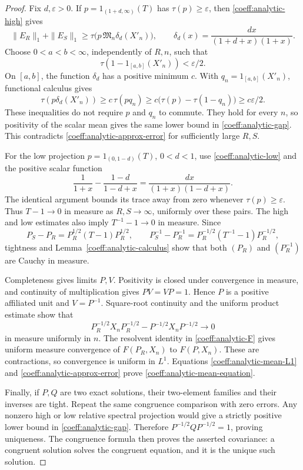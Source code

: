 \begin{proof}
Fix \(d,\varepsilon>0\).  If \(p=1_{(1+d,\infty)}(T)\) has
\(\tau(p)\ge\varepsilon\), then
\eqref{coeff:analytic-high} gives
\begin{equation}\label{coeff:analytic-gap}
 \|E_R\|_1+\|E_S\|_1
 \ge \tau\bigl(p\,\mathfrak M_n\delta_d(X'_n)\bigr),\qquad
 \delta_d(x)=\frac{dx}{(1+d+x)(1+x)}.
\end{equation}
Choose \(0<a<b<\infty\), independently of \(R,n\), such that
\[
 \tau(1-1_{[a,b]}(X'_n))<\varepsilon/2.
\]
On \([a,b]\), the function \(\delta_d\) has a positive minimum \(c\).
With \(q_n=1_{[a,b]}(X'_n)\), functional calculus gives
\[
 \tau(p\delta_d(X'_n))
 \ge c\,\tau(pq_n)
 \ge c\bigl(\tau(p)-\tau(1-q_n)\bigr)
 \ge c\varepsilon/2.
\]
These inequalities do not require \(p\) and \(q_n\) to commute.
They hold for every \(n\), so positivity of the scalar mean gives
the same lower bound in \eqref{coeff:analytic-gap}.  This contradicts
\eqref{coeff:analytic-approx-error} for sufficiently large \(R,S\).

For the low projection \(p=1_{(0,1-d)}(T)\), \(0<d<1\), use
\eqref{coeff:analytic-low} and the positive scalar function
\[
 \frac{1}{1+x}-\frac{1-d}{1-d+x}
       =\frac{dx}{(1+x)(1-d+x)}.
\]
The identical argument bounds its trace away from zero whenever
\(\tau(p)\ge\varepsilon\).  Thus \(T-1\to0\) in measure as \(R,S\to\infty\),
uniformly over these pairs.  The high and low estimates also imply
\(T^{-1}-1\to0\) in measure.  Since
\[
 P_S-P_R=P_R^{1/2}(T-1)P_R^{1/2},\qquad
 P_S^{-1}-P_R^{-1}
       =P_R^{-1/2}(T^{-1}-1)P_R^{-1/2},
\]
tightness and Lemma~\ref{coeff:analytic-calculus} show that both
\((P_R)\) and \((P_R^{-1})\) are Cauchy in measure.

Completeness gives limits \(P,V\).  Positivity is closed under
convergence in measure, and continuity of multiplication gives
\(PV=VP=1\).  Hence \(P\) is a positive affiliated unit and \(V=P^{-1}\).
Square-root continuity and the uniform product estimate show that
\[
 P_R^{-1/2}X_nP_R^{-1/2}
       -P^{-1/2}X_nP^{-1/2}\longrightarrow0
\]
in measure uniformly in \(n\).  The resolvent identity in
\eqref{coeff:analytic-F} gives uniform measure convergence of
\(F(P_R,X_n)\) to \(F(P,X_n)\).  These are contractions, so convergence
is uniform in \(L^1\).  Equations
\eqref{coeff:analytic-mean-L1} and
\eqref{coeff:analytic-approx-error} prove
\eqref{coeff:analytic-mean-equation}.

Finally, if \(P,Q\) are two exact solutions, their two-element families
and their inverses are tight.  Repeat the same congruence comparison
with zero errors.  Any nonzero high or low relative spectral
projection would give a strictly positive lower bound in
\eqref{coeff:analytic-gap}.  Therefore \(P^{-1/2}QP^{-1/2}=1\), proving
uniqueness.  The congruence formula then proves the asserted covariance:
a congruent solution solves the congruent equation, and it is the
unique such solution.
\end{proof}

